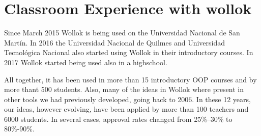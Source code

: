 \section{Classroom Experience with wollok}
\label{experience}

Since March 2015 Wollok is being used on the Universidad Nacional de San Martín. 
In 2016 the Universidad Nacional de Quilmes and Universidad Tecnológica Nacional also started using Wollok in their introductory courses.
In 2017 Wollok started being used also in a highschool. 

All together, it has been used in more than 15 introductory OOP courses and by more thant 500 students.
Also, many of the ideas in Wollok where present in other tools we had previously developed, going back to 2006. In these 12 years, our ideas, however evolving, have been applied by more than 100 teachers and 6000 students. 
In several cases, approval rates changed from 25\%--30\% to 80\%-90\%.

